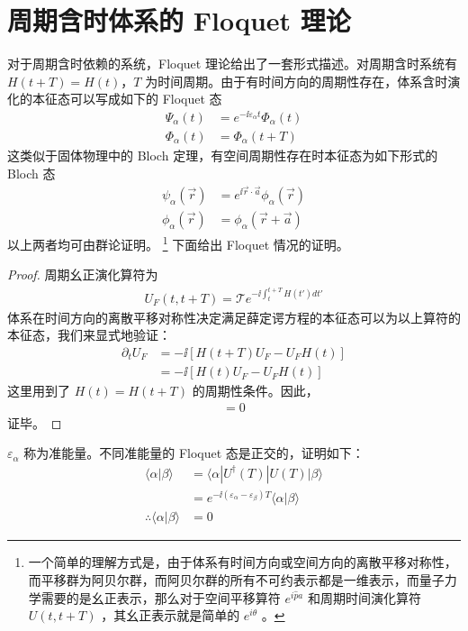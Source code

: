 \section{周期含时体系的 Floquet 理论} \label{sec:floq:theory}
对于周期含时依赖的系统，Floquet 理论给出了一套形式描述\cite{floquet2017}。对周期含时系统有 $H(t+T) = H(t)$，$T$ 为时间周期。由于有时间方向的周期性存在，体系含时演化的本征态可以写成如下的 Floquet 态 
\begin{align}
\Psi_{\alpha}(t) &= e^{-\ii\varepsilon_{\alpha}t}\Phi_{\alpha}(t) \\
\Phi_{\alpha}(t) &= \Phi_{\alpha}(t+T)
\end{align}
这类似于固体物理中的 Bloch 定理，有空间周期性存在时本征态为如下形式的 Bloch 态
\begin{align}
\psi_{\alpha}(\vec{r}) &= e^{\ii\vec{r}\cdot\vec{a}}\phi_{\alpha}(\vec{r}) \\
\phi_{\alpha}(\vec{r}) &= \phi_{\alpha}(\vec{r}+\vec{a})
\end{align}
以上两者均可由群论证明。
\footnote{一个简单的理解方式是，由于体系有时间方向或空间方向的离散平移对称性，而平移群为阿贝尔群，而阿贝尔群的所有不可约表示都是一维表示，而量子力学需要的是幺正表示，那么对于空间平移算符 $e^{i\hat{p}a}$ 和周期时间演化算符 $U(t, t+T)$ ，其幺正表示就是简单的 $e^{i\theta}$ 。}
下面给出 Floquet 情况的证明。
\begin{proof}
周期幺正演化算符为
\begin{align}
U_F(t,t+T) = \mathcal{T} e^{-\ii\int_t^{t+T}H(t')dt'}
\end{align}
体系在时间方向的离散平移对称性决定满足薛定谔方程的本征态可以为以上算符的本征态，我们来显式地验证：
\begin{align}
\partial_tU_F &= -\ii[H(t+T)U_F - U_FH(t)] \\
&= -\ii[H(t)U_F - U_FH(t)]
\end{align}
这里用到了 $H(t) = H(t+T)$ 的周期性条件。因此，
\begin{align}
[\ii\partial_t - H, U_F] = 0
\end{align}
证毕。
\end{proof}

$\varepsilon_{\alpha}$ 称为准能量。不同准能量的 Floquet 态是正交的，证明如下：
\begin{align}
\langle \alpha|\beta \rangle &= \langle \alpha|U^{\dagger}(T)|U(T)|\beta \rangle \\
&= e^{-\ii(\varepsilon_{\alpha}-\varepsilon_{\beta})T}\langle \alpha|\beta \rangle \\
\therefore \langle \alpha|\beta \rangle &= 0
\end{align}


